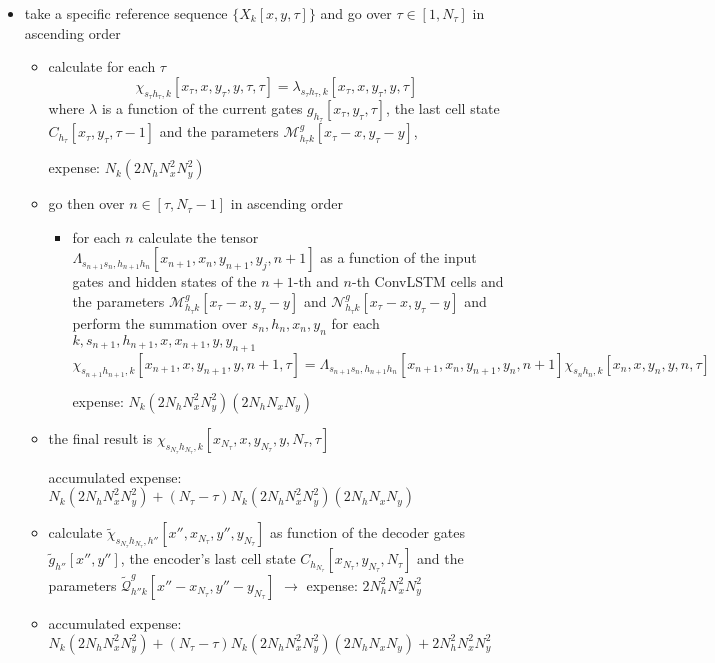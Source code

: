 \documentclass[10pt,a4paper]{article}
\begin{document}
\begin{itemize}
\item take a specific reference sequence $\{X_k[x,y,\tau]\}$ and go over $\tau \in [1,N_\tau]$ in ascending order
\begin{itemize}
\item calculate for each $\tau$
$$ \chi_{s_\tau h_\tau,k}[x_\tau, x, y_\tau, y, \tau, \tau] = \lambda_{s_\tau h_\tau,k}[x_\tau, x, y_\tau, y, \tau] $$
where $\lambda$ is a function of the current gates $g_{h_\tau}[x_\tau,y_\tau,\tau]$, the last cell state $C_{h_\tau}[x_\tau,y_\tau,\tau-1]$ and the parameters $\mathcal{M}^{g}_{h_\tau k}[x_\tau-x,y_\tau-y]$, \begin{tcolorbox} expense: $N_k (2 N_h N_x^2 N_y^2)$ \end{tcolorbox}
\item go then over $n \in [\tau, N_\tau-1]$ in ascending order
\begin{itemize}
\item for each $n$ calculate the tensor $\Lambda_{s_{n+1}s_n,h_{n+1}h_n}[x_{n+1}, x_n, y_{n+1}, y_j, n+1]$ as a function of the input gates and hidden states of the $n+1$-th and $n$-th ConvLSTM cells and the parameters $\mathcal{M}^{g}_{h_\tau k}[x_\tau-x,y_\tau-y]$ and $\mathcal{N}^{g}_{h_\tau k}[x_\tau-x,y_\tau-y]$
and perform the summation over $s_n, h_n, x_n, y_n$ for each $k, s_{n+1}, h_{n+1}, x, x_{n+1}, y, y_{n+1}$
$$ \chi_{s_{n+1} h_{n+1},k}[x_{n+1}, x, y_{n+1}, y, n+1, \tau] =  \Lambda_{s_{n+1}s_n,h_{n+1}h_n}[x_{n+1}, x_n, y_{n+1}, y_n, n+1] 
\chi_{s_{n} h_{n},k}[x_{n}, x, y_{n}, y, n, \tau]$$
\begin{tcolorbox} expense: $N_k (2 N_h N_x^2 N_y^2) (2 N_h N_x N_y)$ \end{tcolorbox}
\end{itemize}
\item the final result is $\chi_{s_{N_\tau} h_{N_\tau},k}[x_{N_\tau}, x, y_{N_\tau}, y, N_\tau, \tau]$
\begin{tcolorbox} accumulated expense: $N_k (2 N_h N_x^2 N_y^2) +(N_\tau - \tau) N_k (2 N_h N_x^2 N_y^2) (2 N_h N_x N_y)$ \end{tcolorbox}
\item calculate $\tilde{\chi}_{s_{N_\tau}h_{N_\tau}, h''}[x'', x_{N_\tau}, y'', y_{N_\tau}]$ as function of the decoder gates $\tilde{g}_{h''}[x'',y'']$, the encoder's last cell state $C_{h_{N_\tau}}[x_{N_\tau},y_{N_\tau},{N_\tau}]$ and the parameters $\tilde{\mathcal{Q}}^{g}_{h'' k}[x''-x_{N_\tau},y''-y_{N_\tau}]$ $\to$ expense: $2 N_h^2 N_x^2 N_y^2$
\item accumulated expense: $N_k (2 N_h N_x^2 N_y^2) +(N_\tau - \tau) N_k (2 N_h N_x^2 N_y^2) (2 N_h N_x N_y)+2 N_h^2 N_x^2 N_y^2$

\end{itemize}
\end{itemize}
\end{document}
